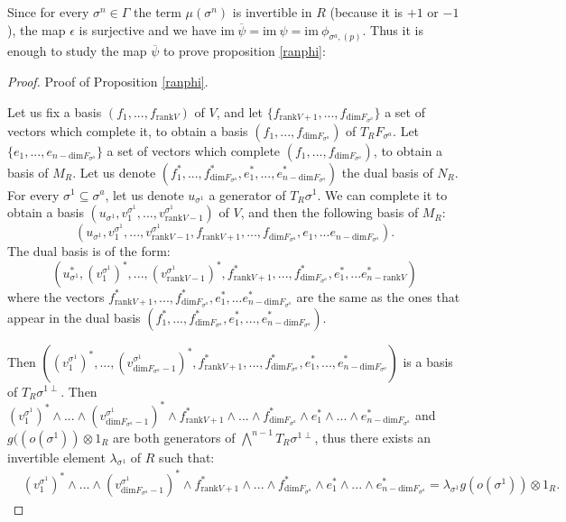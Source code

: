\documentclass{article}
\begin{document}
Since for every $\sigma^n \in \Gamma$ the term $\mu(\sigma^n)$ is invertible in $R$ (because it is $+1$ or $-1$), the map $\epsilon$ is surjective and we have $\mathrm{im} ~ \overline{\psi} = \mathrm{im} ~ \psi = \mathrm{im}~\phi_{\sigma^{a},(p)}$. Thus it is enough to study the map $\overline{\psi}$ to prove proposition \ref{ranphi}:

\begin{proof}
    Proof of Proposition \ref{ranphi}.
    
    Let us fix a basis $(f_1,...,f_{\mathrm{rank} V})$ of $V$, and let $\{f_{\mathrm{rank}V+1},...,f_{\mathrm{dim}F_{\sigma^a}}\}$ a set of vectors which complete it, to obtain a basis $(f_1,...,f_{\mathrm{dim} F_{\sigma^a}})$ of $T_R F_{\sigma^a}$. Let $\{e_1,...,e_{n-\mathrm{dim}F_{\sigma^a}}\}$ a set of vectors which complete $(f_1,...,f_{\mathrm{dim} F_{\sigma^a}})$, to obtain a basis of $M_R$. Let us denote $(f_1^*,...,f_{\mathrm{dim} F_{\sigma^a}}^*,e_1^*,...,e_{n-\mathrm{dim} F_{\sigma^a}}^*)$ the dual basis of $N_R$. For every $\sigma^1 \subseteq \sigma^a$, let us denote $u_{\sigma^1}$ a generator of $T_R\sigma^1$. We can complete it to obtain a basis $(u_{\sigma^1},v_1^{\sigma^1},...,v_{\mathrm{rank}V -1}^{\sigma^1})$ of $V$, and then the following basis of $M_R$:
    \begin{equation*}
        (u_{\sigma^1},v_1^{\sigma^1},...,v_{\mathrm{rank}V -1}^{\sigma^1},f_{\mathrm{rank}V+1},...,f_{\mathrm{dim}F_{\sigma^a}},e_1,...e_{n-\mathrm{dim}F_{\sigma^a}}).
    \end{equation*}
    The dual basis is of the form:
    \begin{equation*}
        (u_{\sigma^1}^*,(v_1^{\sigma^1})^*,...,(v_{\mathrm{rank}V -1}^{\sigma^1})^*,f_{\mathrm{rank}V+1}^*,...,f_{\mathrm{dim}F_{\sigma^a}}^*,e_1^*,...e_{n-\mathrm{rank}V}^*)
    \end{equation*}
    where the vectors $f_{\mathrm{rank}V+1}^*,...,f_{\mathrm{dim}F_{\sigma^a}}^*,e_1^*,...e_{n-\mathrm{dim}F_{\sigma^a}}^*$ are the same as the ones that appear in the dual basis $(f_1^*,...,f_{\mathrm{dim} F_{\sigma^a}}^*,e_1^*,...,e_{n-\mathrm{dim} F_{\sigma^a}}^*)$.
    
    Then $((v_1^{\sigma^1})^*, ..., (v_{\mathrm{dim}F_{\sigma^a} -1}^{\sigma^1})^*, f_{\mathrm{rank}V+1}^*, ..., f_{\mathrm{dim}F_{\sigma^a}}^*, e_1^* ,..., e_{n-\mathrm{dim}F_{\sigma^a}}^*)$ is a basis of $T_R \sigma^{1\perp}$. Then $(v_1^{\sigma^1})^*\wedge...\wedge(v_{\mathrm{dim}F_{\sigma^a}-1}^{\sigma^1})^*\wedge f_{\mathrm{rank}V+1}^*\wedge...\wedge f_{\mathrm{dim}F_{\sigma^a}} ^*\wedge e_1^*\wedge... \wedge e_{n-\mathrm{dim}F_{\sigma^a}}^*$ and $g((o(\sigma^1)) \otimes 1_R$ are both generators of $\bigwedge^{n-1}T_R\sigma^{1\perp}$, thus there exists an invertible element $\lambda_{\sigma^1}$ of $R$ such that:
    \begin{align*}
        &(v_1^{\sigma^1})^*\wedge...\wedge(v_{\mathrm{dim}F_{\sigma^a} -1}^{\sigma^1})^*\wedge f_{\mathrm{rank}V+1}^* \wedge...\wedge f_{\mathrm{dim}F_{\sigma^a}}^* \wedge e_1^*\wedge... \wedge e_{n-\mathrm{dim}F_{\sigma^a}}^* =\lambda_{\sigma^1} g(o(\sigma^1)) \otimes 1_R.
    \end{align*}


\end{proof}
\end{document}
